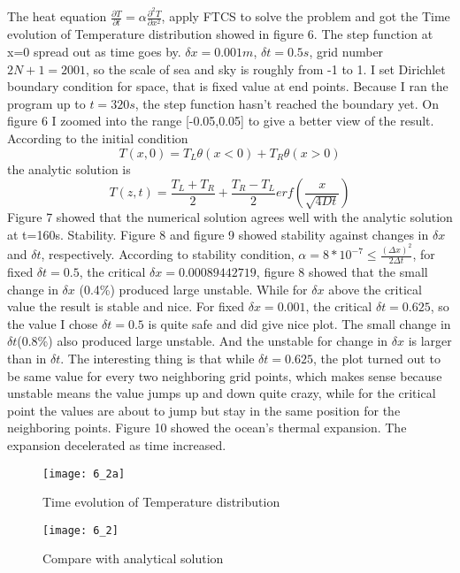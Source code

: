 \documentclass{article}
\begin{document}
The heat equation  $\frac{\partial T}{\partial t} = \alpha \frac{\partial^2 T}{\partial x^2}$, apply FTCS to solve the problem and got the Time evolution of Temperature distribution showed in figure 6.  The step function at x=0 spread out as time goes by.  $\delta x=0.001m$, $\delta t=0.5s$, grid number $2N+1=2001$, so the scale of sea and sky is roughly from -1 to 1.  I set Dirichlet boundary condition for space, that is fixed value at end points.  Because I ran the program up to $t=320s$, the step function hasn't reached the boundary yet.  On figure 6 I zoomed into the range [-0.05,0.05] to give a better view of the result.
\vskip 0.5cm
According to the initial condition
\[T(x,0) = T_L \theta(x<0) + T_R \theta(x>0)\]
the analytic solution is 
 \[T(z,t) =  \frac{T_L+T_R}{2} + \frac{T_R-T_L}{2} erf(\frac{x}{\sqrt{4Dt}})\]
 Figure 7 showed that the numerical solution agrees well with the analytic solution at t=160s.
\vskip 0.5cm
Stability.  Figure 8 and figure 9 showed stability against changes in $\delta x$ and $\delta t$, respectively.  According to stability condition, $\alpha = 8*10^{-7} \leq \frac{(\Delta x)^2}{2\Delta t}$, for fixed $\delta t=0.5$, the critical $\delta x=0.00089442719$, figure 8 showed that the small change in $\delta x$ (0.4\%) produced large unstable. While for $\delta x$ above the critical value the result is stable and nice.  For fixed $\delta x=0.001$, the critical $\delta t=0.625$, so the value I chose $\delta t=0.5$ is quite safe and did give nice plot.  The small change in $\delta t$(0.8\%) also produced large unstable.  And the unstable for change in $\delta x$ is larger than in $\delta t$.  The interesting thing is that while $\delta t=0.625$, the plot turned out to be same value for every two neighboring grid points, which makes sense because unstable means the value jumps up and down quite crazy, while for the critical point the values are about to jump but stay in the same position for the neighboring points.
\vskip 0.5cm
Figure 10 showed the ocean's thermal expansion.  The expansion decelerated as time increased.

\begin{figure} [ht]
\texttt{[image: 6\_2a]}
\caption{Time evolution of Temperature distribution}
\end{figure}

\begin{figure} [ht]
\texttt{[image: 6\_2]}
\caption{Compare with analytical solution}
\end{figure}
\end{document}
